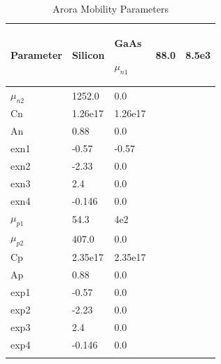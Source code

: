 



\small

\begin{longtable}[htbp]{|
>{\setlength{\hsize}{0.5\hsize}}Y|
>{\setlength{\hsize}{0.5\hsize}}Y|
>{\setlength{\hsize}{0.5\hsize}}Y|} 
  \caption[Arora Mobility Parameters]
   {Arora Mobility Parameters \label{arora}}
\\
\hline

\color{white}\bf Parameter &
\color{white}\bf Silicon &
\color{white}\bf GaAs \endhead  \hline

  $\mu_{n1}$   &    88.0   &  8.5e3  \\ \hline
  $\mu_{n2}$   & 1252.0    &  0.0    \\ \hline
  Cn           & 1.26e17   & 1.26e17 \\ \hline
  An           &  0.88     &  0.0    \\ \hline
  exn1         & -0.57     &  -0.57  \\ \hline
  exn2         & -2.33     &  0.0    \\ \hline
  exn3         &  2.4      &  0.0    \\ \hline
  exn4         & -0.146    &  0.0    \\ \hline
  $\mu_{p1}$   &  54.3     &  4e2    \\ \hline
  $\mu_{p2}$   & 407.0     &  0.0    \\ \hline
  Cp           & 2.35e17   & 2.35e17  \\ \hline
  Ap           &   0.88    &  0.0     \\ \hline
  exp1         &  -0.57    &  0.0     \\ \hline
  exp2         & -2.23     &  0.0     \\ \hline
  exp3         &  2.4      &  0.0     \\ \hline
  exp4         & -0.146    &  0.0     \\ \hline

\label{aroraMobilityParams}
\end{longtable}
